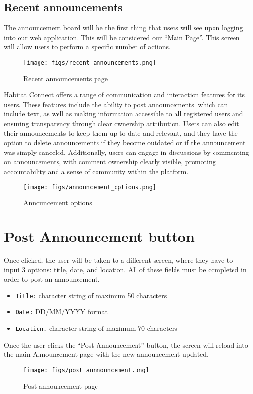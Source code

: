 \documentclass[conference]{IEEEtran}
\begin{document}
\subsection{Recent announcements}
The announcement board will be the first thing that users will see upon logging into our web application. This will be considered our “Main Page”. This screen will allow users to perform a specific number of actions.
\begin{figure}[H]
\centering
\texttt{[image: figs/recent\_announcements.png]}
\caption{Recent announcements page}
\label{fig:Recent announcements page}
\end{figure}
Habitat Connect offers a range of communication and interaction features for its users. These features include the ability to post announcements, which can include text, as well as making information accessible to all registered users and ensuring transparency through clear ownership attribution. Users can also edit their announcements to keep them up-to-date and relevant, and they have the option to delete announcements if they become outdated or if the announcement was simply canceled. Additionally, users can engage in discussions by commenting on announcements, with comment ownership clearly visible, promoting accountability and a sense of community within the platform.
\begin{figure}[H]
\centering
\texttt{[image: figs/announcement\_options.png]}
\caption{Announcement options}
\label{fig:Announcement options}
\end{figure}
\section*{Post Announcement button}
Once clicked, the user will be taken to a different screen, where they have to input 3 options: title, date, and location. All of these fields must be completed in order to post an announcement. 
\begin{itemize}
    \item \texttt{Title:} character string of maximum 50 characters
    \item \texttt{Date:} DD/MM/YYYY format
    \item \texttt{Location:} character string  of maximum 70 characters
\end{itemize}
Once the user clicks the “Post Announcement” button, the screen will reload into the main Announcement page with the new announcement updated.
\begin{figure}[H]
\centering
\texttt{[image: figs/post\_annnouncement.png]}
\caption{Post announcement page}
\label{fig:Post announcement page}
\end{figure}
\end{document}
